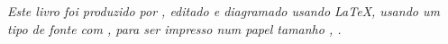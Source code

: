 \cleardoublepage

\null
\vfill
\newpage

\null
\vfill
\thispagestyle{empty}


{\normalsize \it Este livro foi produzido por \myauthor, editado e diagramado usando \LaTeX,
usando um tipo de fonte com \showfont,
para ser impresso num papel tamanho \imprimirpapersize,  \imprimirdata.
\vspace*{4pt}}






